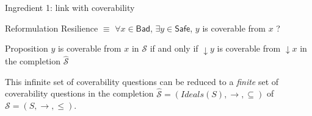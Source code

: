 \documentclass{beamer}
\newcommand{\Bad}{\textsf{Bad}}
\newcommand{\Safe}{\textsf{Safe}}
\begin{document}
  \begin{frame}{Ingredient 1: link with coverability}
  

  \begin{block}{Reformulation}
Resilience $\equiv$ $\forall x \in \Bad$, $\exists y \in \Safe$, $y$ is coverable from $x$ ?
 \end{block}
 
 \pause

  \begin{block}{Proposition}
   $y$ is coverable from $x$ in $\mathscr{S}$ if and only if $\mathop{\downarrow} y$ is coverable from $\mathop{\downarrow} x$ in the completion $\hat{\mathscr{S}} $ 
 \end{block}
 
\pause

  \begin{block}{ }
This infinite set of coverability questions can be reduced to a \emph{finite} set of coverability questions in the completion $\hat{\mathscr{S}}=(Ideals(S),\rightarrow, \subseteq)$ of $\mathscr{S}=(S,\rightarrow, \leq)$. 
 \end{block}
 


  \end{frame}
\end{document}
